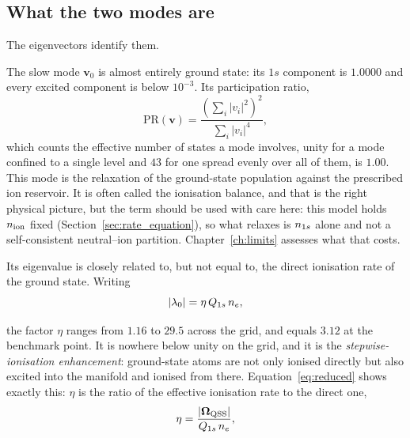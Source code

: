 \subsection{What the two modes are}

The eigenvectors identify them.

The slow mode $\bm{v}_0$ is almost entirely ground state: its $1s$ component is
$1.0000$ and every excited component is below $10^{-3}$. Its participation ratio,
\begin{equation}
  \mathrm{PR}(\bm{v}) = \frac{\left(\sum_i |v_i|^2\right)^2}{\sum_i |v_i|^4},
  \label{eq:participation_ratio}
\end{equation}
which counts the effective number of states a mode involves, unity for a mode
confined to a single level and $43$ for one spread evenly over all of them, is
$1.00$. This mode is the relaxation of the
ground-state population against the prescribed ion reservoir. It is often
called the ionisation balance, and that is the right physical picture, but the
term should be used with care here: this model holds $n_{\mathrm{ion}}$ fixed
(Section~\ref{sec:rate_equation}), so what relaxes is $n_{1s}$ alone and not a
self-consistent neutral--ion partition. Chapter~\ref{ch:limits} assesses what
that costs.

Its eigenvalue is closely related to, but not equal to, the direct ionisation
rate of the ground state. Writing
\begin{equation}
  |\lambda_0| = \eta\,Q_{1s}\,n_e ,
  \label{eq:stepwise_enhancement}
\end{equation}

\noindent the factor $\eta$ ranges from $1.16$ to $29.5$ across the grid, and
equals $3.12$ at the benchmark point. It is nowhere below unity on the grid, and
it is the \emph{stepwise-ionisation enhancement}: ground-state atoms are not only
ionised directly but also excited into the manifold and ionised from there.
Equation~\eqref{eq:reduced} shows exactly this: $\eta$ is the ratio of the
effective ionisation rate to the direct one,
\begin{equation}
  \eta = \frac{|\bm{\Omega}_{\mathrm{QSS}}|}{Q_{1s}\,n_e},
  \label{eq:eta_def}
\end{equation}

